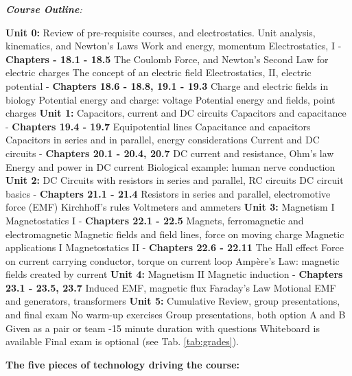 \documentclass[10pt]{article}
\begin{document}
\textit{\textbf{Course Outline}:}
\begin{outline}[enumerate]
\1 \textbf{Unit 0:} Review of pre-requisite courses, and electrostatics.
\2 Unit analysis, kinematics, and Newton's Laws
\2 Work and energy, momentum
\2 Electrostatics, I - \textbf{Chapters - 18.1 - 18.5}
\3 The Coulomb Force, and Newton's Second Law for electric charges
\3 The concept of an electric field
\2 Electrostatics, II, electric potential - \textbf{Chapters 18.6 - 18.8, 19.1 - 19.3}
\3 Charge and electric fields in biology
\3 Potential energy and charge: voltage
\3 Potential energy and fields, point charges
\1 \textbf{Unit 1:} Capacitors, current and DC circuits
\2 Capacitors and capacitance - \textbf{Chapters 19.4 - 19.7}
\3 Equipotential lines
\3 Capacitance and capacitors
\3 Capacitors in series and in parallel, energy considerations
\2 Current and DC circuits - \textbf{Chapters 20.1 - 20.4, 20.7}
\3 DC current and resistance, Ohm's law
\3 Energy and power in DC current
\3 Biological example: human nerve conduction
\1 \textbf{Unit 2:} DC Circuits with resistors in series and parallel, RC circuits
\2 DC circuit basics - \textbf{Chapters 21.1 - 21.4}
\3 Resistors in series and parallel, electromotive force (EMF)
\3 Kirchhoff's rules
\3 Voltmeters and ammeters
\1 \textbf{Unit 3:} Magnetism I
\2 Magnetostatics I - \textbf{Chapters 22.1 - 22.5}
\3 Magnets, ferromagnetic and electromagnetic
\3 Magnetic fields and field lines, force on moving charge
\3 Magnetic applications I
\2 Magnetostatics II - \textbf{Chapters 22.6 - 22.11}
\3 The Hall effect
\3 Force on current carrying conductor, torque on current loop
\3 Amp\`{e}re's Law: magnetic fields created by current
\1 \textbf{Unit 4:} Magnetism II
\2 Magnetic induction - \textbf{Chapters 23.1 - 23.5, 23.7}
\3 Induced EMF, magnetic flux
\3 Faraday's Law
\3 Motional EMF and generators, transformers
\1 \textbf{Unit 5:} Cumulative Review, group presentations, and final exam
\2 No warm-up exercises
\2 Group presentations, both option A and B
\3 Given as a pair or team
-15 minute duration with questions
\3 Whiteboard is available
\3 Final exam is optional (see Tab. \ref{tab:grades}).
\end{outline}
\textbf{The five pieces of technology driving the course:}
\end{document}
